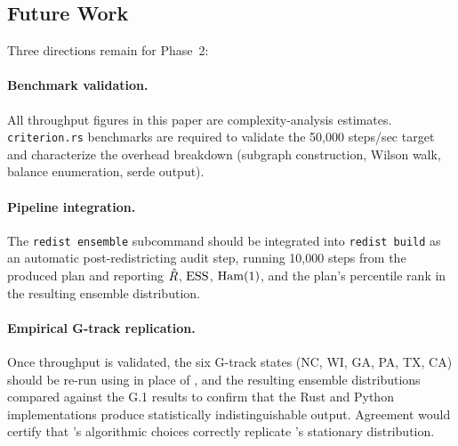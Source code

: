 \subsection{Future Work}

Three directions remain for Phase~2:

\paragraph{Benchmark validation.}
All throughput figures in this paper are complexity-analysis estimates.
\texttt{criterion.rs} benchmarks are required to validate the 50{,}000
steps/sec target and characterize the overhead breakdown (subgraph
construction, Wilson walk, balance enumeration, serde output).

\paragraph{Pipeline integration.}
The \texttt{redist ensemble} subcommand should be integrated into
\texttt{redist build} as an automatic post-redistricting audit step,
running 10{,}000 steps from the produced plan and reporting
$\hat{R}$, $\mathrm{ESS}$, $\mathrm{Ham}(1)$, and the plan's percentile rank in the
resulting ensemble distribution.

\paragraph{Empirical G-track replication.}
Once throughput is validated, the six G-track states (NC, WI, GA, PA,
TX, CA) should be re-run using \re{} in place of \gc{}, and the
resulting ensemble distributions compared against the G.1 results to
confirm that the Rust and Python implementations produce statistically
indistinguishable output.
Agreement would certify that \re{}'s algorithmic choices correctly
replicate \gc{}'s stationary distribution.
